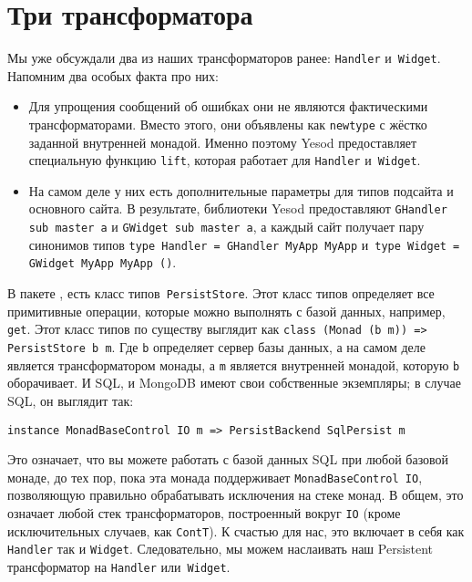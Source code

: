 \section{Три трансформатора}
Мы уже обсуждали два из наших трансформаторов ранее: \lstinline'Handler'
и~\lstinline'Widget'. Напомним два особых факта про них:
\begin{itemize}
    \item  Для упрощения сообщений об ошибках они не являются фактическими
        трансформаторами. Вместо этого, они объявлены как \lstinline'newtype' с
        жёстко заданной внутренней монадой.  Именно поэтому Yesod предоставляет
        специальную функцию \lstinline'lift', которая работает для
        \lstinline'Handler' и~\lstinline'Widget'.
    \item  На самом деле у них есть дополнительные параметры для типов подсайта
        и основного сайта. В результате, библиотеки Yesod предоставляют
        \lstinline'GHandler sub master a' и \lstinline'GWidget sub master a', а
        каждый сайт получает пару синонимов типов
        \lstinline'type Handler = GHandler MyApp MyApp'
        и~\lstinline'type Widget = GWidget MyApp MyApp ()'.
\end{itemize}

В пакете
, есть
класс типов~\lstinline'PersistStore'. Этот класс типов определяет все
примитивные операции, которые можно выполнять с базой данных, например,
\lstinline'get'. Этот класс типов по существу выглядит как
\lstinline'class (Monad (b m)) => PersistStore b m'. Где \lstinline'b'
определяет сервер базы данных, а на самом деле является трансформатором монады,
а \lstinline'm' является внутренней монадой, которую \lstinline'b' оборачивает.
И SQL, и MongoDB имеют свои собственные экземпляры; в случае SQL, он выглядит
так:
\begin{lstlisting}
instance MonadBaseControl IO m => PersistBackend SqlPersist m
\end{lstlisting}

Это означает, что вы можете работать с базой данных SQL при любой базовой
монаде, до тех пор, пока эта монада поддерживает \lstinline'MonadBaseControl IO',
позволяющую правильно обрабатывать исключения на стеке монад. В общем,
это означает любой стек трансформаторов, построенный вокруг \lstinline'IO'
(кроме исключительных случаев, как \lstinline'ContT'). К счастью для нас, это
включает в себя как \lstinline'Handler' так и \lstinline'Widget'. Следовательно,
мы можем наслаивать наш Persistent трансформатор на \lstinline'Handler'
или~\lstinline'Widget'.

